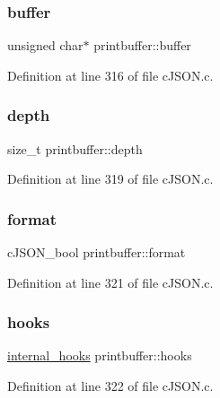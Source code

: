 \subsubsection{\texorpdfstring{buffer}{buffer}}
{\footnotesize\ttfamily unsigned char$\ast$ printbuffer\+::buffer}



Definition at line 316 of file c\+J\+S\+O\+N.\+c.

\mbox{\label{structprintbuffer_aa7311b5da38ff8d1737824c611b48732}} 
\subsubsection{\texorpdfstring{depth}{depth}}
{\footnotesize\ttfamily size\+\_\+t printbuffer\+::depth}



Definition at line 319 of file c\+J\+S\+O\+N.\+c.

\mbox{\label{structprintbuffer_a75d3f480f5308e7f4afecf30e11277ef}} 
\subsubsection{\texorpdfstring{format}{format}}
{\footnotesize\ttfamily c\+J\+S\+O\+N\+\_\+bool printbuffer\+::format}



Definition at line 321 of file c\+J\+S\+O\+N.\+c.

\mbox{\label{structprintbuffer_a43a8b3bcc644432f12f5aed5159d2520}} 
\subsubsection{\texorpdfstring{hooks}{hooks}}
{\footnotesize\ttfamily \hyperlink{structinternal__hooks}{internal\+\_\+hooks} printbuffer\+::hooks}



Definition at line 322 of file c\+J\+S\+O\+N.\+c.

\mbox{\label{structprintbuffer_a1a679f8b6fe9b413fb3a87203b0f5bc8}} 
